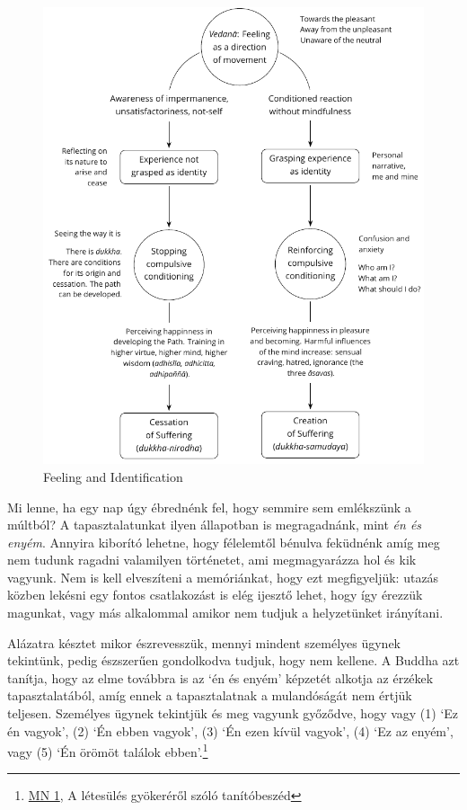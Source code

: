 \begin{figure}[h]
\caption{Feeling and Identification}\label{fig-feeling-identification}
\bigskip
\includegraphics[width=\linewidth]{./manuscript/tex/diagrams/feeling-identification.pdf}
\end{figure}

\clearpage
\normalpagelayout

Mi lenne, ha egy nap úgy ébrednénk fel, hogy semmire sem emlékszünk a
múltból? A tapasztalatunkat ilyen állapotban is megragadnánk, mint
\emph{én és enyém}. Annyira kiborító lehetne, hogy félelemtől bénulva
feküdnénk amíg meg nem tudunk ragadni valamilyen történetet, ami
megmagyarázza hol és kik vagyunk. Nem is kell elveszíteni a memóriánkat,
hogy ezt megfigyeljük: utazás közben lekésni egy fontos csatlakozást is
elég ijesztő lehet, hogy így érezzük magunkat, vagy más alkalommal
amikor nem tudjuk a helyzetünket irányítani.

Alázatra késztet mikor észrevesszük, mennyi mindent személyes ügynek
tekintünk, pedig észszerűen gondolkodva tudjuk, hogy nem kellene. A
Buddha azt tanítja, hogy az elme továbbra is az `én és enyém' képzetét
alkotja az érzékek tapasztalatából, amíg ennek a tapasztalatnak a
mulandóságát nem értjük teljesen. Személyes ügynek tekintjük és meg
vagyunk győződve, hogy vagy (1) `Ez én vagyok', (2) `Én ebben vagyok',
(3) `Én ezen kívül vagyok', (4) `Ez az enyém', vagy (5) `Én örömöt
találok ebben'.\footnote{\href{https://a-buddha-ujja.hu/mn-1/hu/pressing-lajos}{MN
  1}, A létesülés gyökeréről szóló tanítóbeszéd}

